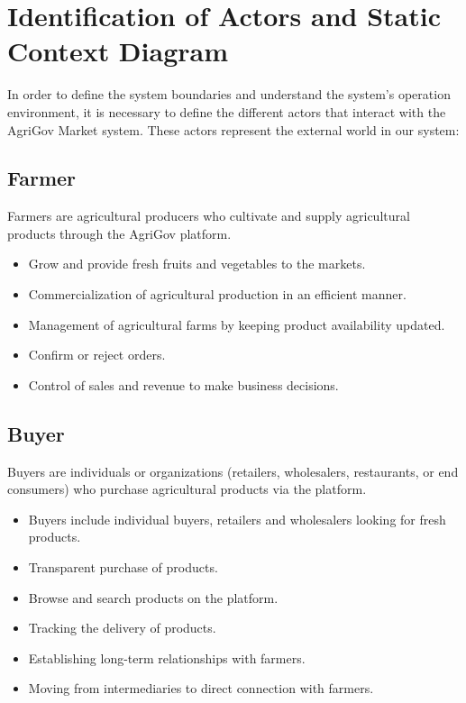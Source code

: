 
\section{Identification of Actors and Static Context Diagram}

In order to define the system boundaries and understand the system's operation environment, it is necessary to define the different actors that interact with the AgriGov Market system. These actors represent the external world in our system: 


\subsection{Farmer}

Farmers are agricultural producers who cultivate and supply agricultural products through the AgriGov platform.

\begin{itemize}
	\item Grow and provide fresh fruits and vegetables to the markets.
	\item Commercialization of agricultural production in an efficient manner.
	\item Management of agricultural farms by keeping product availability updated.
	\item Confirm or reject orders.
	\item Control of sales and revenue to make business decisions.
\end{itemize}

\subsection{Buyer}

Buyers are individuals or organizations (retailers, wholesalers, restaurants, or end consumers) who purchase agricultural products via the platform.

\begin{itemize}
	\item Buyers include individual buyers, retailers and wholesalers looking for fresh products.
	\item Transparent purchase of products.
	\item Browse and search products on the platform.
	\item Tracking the delivery of products.
	\item Establishing long-term relationships with farmers.
	\item Moving from intermediaries to direct connection with farmers.
\end{itemize}

